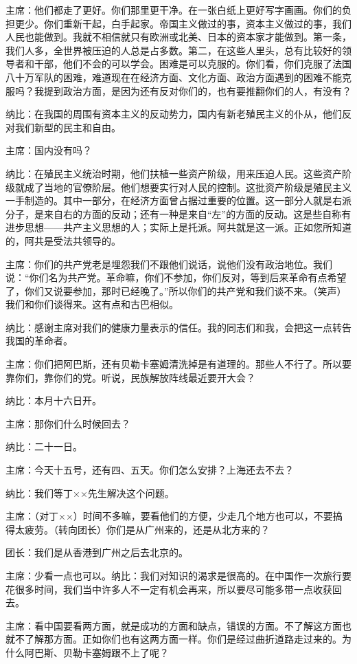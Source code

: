 主席：他们都走了更好。你们那里更干净。在一张白纸上更好写字画画。你们的负担更少。你们重新干起，白手起家。帝国主义做过的事，资本主义做过的事，我们人民也能做到。我就不相信就只有欧洲或北美、日本的资本家才能做到。第一条，我们人多，全世界被压迫的人总是占多数。第二，在这些人里头，总有比较好的领导者和干部，他们不会的可以学会。困难是可以克服的。你们看，你们克服了法国八十万军队的困难，难道现在在经济方面、文化方面、政治方面遇到的困难不能克服吗？我提到政治方面，是因为还有反对你们的，也有要推翻你们的人，有没有？

纳比：在我国的周围有资本主义的反动势力，国内有新老殖民主义的仆从，他们反对我们新型的民主和自由。

主席：国内没有吗？

纳比：在殖民主义统治时期，他们扶植一些资产阶级，用来压迫人民。这些资产阶级就成了当地的官僚阶层。他们想要实行对人民的控制。这批资产阶级是殖民主义一手制造的。其中一部分，在经济方面曾占据过重要的位置。这一部分人就是右派分子，是来自右的方面的反动；还有一种是来自“左”的方面的反动。这是些自称有进步思想——共产主义思想的人；实际上是托派。阿共就是这一派。正如您所知道的，阿共是受法共领导的。

主席：你们的共产党老是埋怨我们不跟他们说话，说他们没有政治地位。我们说：“你们名为共产党。革命嘛，你们不参加，你们反对，等到后来革命有点希望了，你们又说要参加，那时已经晚了。”所以你们的共产党和我们谈不来。（笑声）我们和你们谈得来。这有点和古巴相似。

纳比：感谢主席对我们的健康力量表示的信任。我的同志们和我，会把这一点转告我国的革命者。

主席：你们把阿巴斯，还有贝勒卡塞姆清洗掉是有道理的。那些人不行了。所以要靠你们，靠你们的党。听说，民族解放阵线最近要开大会？

纳比：本月十六日开。

主席：那你们什么时候回去？

纳比：二十一日。

主席：今天十五号，还有四、五天。你们怎么安排？上海还去不去？

纳比：我们等丁××先生解决这个问题。

主席：（对丁××）时间不多嘛，要看他们的方便，少走几个地方也可以，不要搞得太疲劳。（转向团长）你们是从广州来的，还是从北方来的？

团长：我们是从香港到广州之后去北京的。

主席：少看一点也可以。纳比：我们对知识的渴求是很高的。在中国作一次旅行要花很多时间，我们当中许多人不一定有机会再来，所以要尽可能多带一点收获回去。

主席：看中国要看两方面，就是成功的方面和缺点，错误的方面。不了解这方面也就不了解那方面。正如你们也有这两方面一样。你们是经过曲折道路走过来的。为什么阿巴斯、贝勒卡塞姆跟不上了呢？


